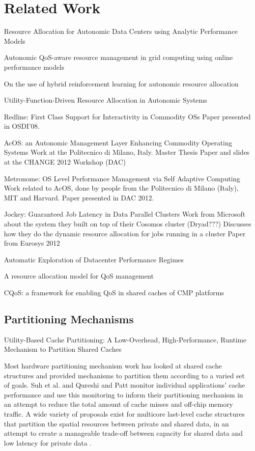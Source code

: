 \section{Related Work}

Resource Allocation for Autonomic Data Centers using Analytic Performance Models
	\cite{1078472}
	
Autonomic QoS-aware resource management in grid computing using online performance models
	\cite{1345325}

On the use of hybrid reinforcement learning for autonomic resource allocation
\cite{1285843}
	
Utility-Function-Driven Resource Allocation in Autonomic Systems
\cite{1078493}

Redline: First Class Support for Interactivity in Commodity OSs \cite{Redline}
Paper presented in OSDI'08.

AcOS: an Autonomic Management Layer Enhancing Commodity Operating Systems \cite{AcOS}
Work at the Politecnico di Milano, Italy.
Master Thesis
Paper and slides at the CHANGE 2012 Workshop (DAC)

Metronome: OS Level Performance Management via Self Adaptive Computing \cite{Metronome}
Work related to AcOS, done by people from the Politecnico di Milano (Italy), MIT and Harvard.
Paper presented in DAC 2012.

Jockey: Guaranteed Job Latency in Data Parallel Clusters \cite{Jockey}
Work from Microsoft about the system they built on top of their Cosomos cluster (Dryad???)
Discusses how they do the dynamic resource allocation for jobs running in a cluster
Paper from Eurosys 2012

Automatic Exploration of Datacenter Performance Regimes
\cite{bodik-acdc09}

A resource allocation model for QoS management
\cite{828990}

CQoS: a framework for enabling QoS in shared caches of CMP platforms
\cite{1006246}

\subsection{Partitioning Mechanisms}
\label{sec:rel:pm}

Utility-Based Cache Partitioning: A Low-Overhead, High-Performance, Runtime Mechanism to Partition Shared Caches
\cite{1194855}

Most hardware partitioning mechanism work has looked at shared cache structures and provided mechanisms to partition them according to a varied set of goals.  Suh et al. \cite{876484, 967444} and Qureshi and Patt \cite{1194855} monitor individual applications' cache performance and use this monitoring to inform their partitioning mechanism in an attempt to reduce the total amount of cache misses and off-chip memory traffic. A wide variety of proposals exist for multicore last-level cache structures that partition the spatial resources between private and shared data, in an attempt to create a manageable trade-off between capacity for shared data and low latency for private data \cite{1275005,1194858,1318096,1088154,1399973,1069998,1399982}.

